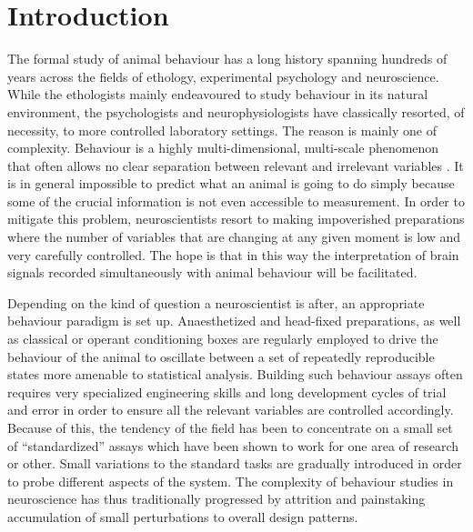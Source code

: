 				
\section{Introduction}

The formal study of animal behaviour has a long history spanning hundreds of years across the fields of ethology, experimental psychology and neuroscience. While the ethologists mainly endeavoured to study behaviour in its natural environment, the psychologists and neurophysiologists have classically resorted, of necessity, to more controlled laboratory settings. The reason is mainly one of complexity. Behaviour is a highly multi-dimensional, multi-scale phenomenon that often allows no clear separation between relevant and irrelevant variables \cite{Gomez-Marin2014}. It is in general impossible to predict what an animal is going to do simply because some of the crucial information is not even accessible to measurement. In order to mitigate this problem, neuroscientists resort to making impoverished preparations where the number of variables that are changing at any given moment is low and very carefully controlled. The hope is that in this way the interpretation of brain signals recorded simultaneously with animal behaviour will be facilitated.

Depending on the kind of question a neuroscientist is after, an appropriate behaviour paradigm is set up. Anaesthetized and head-fixed preparations, as well as classical or operant conditioning boxes are regularly employed to drive the behaviour of the animal to oscillate between a set of repeatedly reproducible states more amenable to statistical analysis. Building such behaviour assays often requires very specialized engineering skills and long development cycles of trial and error in order to ensure all the relevant variables are controlled accordingly. Because of this, the tendency of the field has been to concentrate on a small set of ``standardized'' assays which have been shown to work for one area of research or other. Small variations to the standard tasks are gradually introduced in order to probe different aspects of the system. The complexity of behaviour studies in neuroscience has thus traditionally progressed by attrition and painstaking accumulation of small perturbations to overall design patterns.

